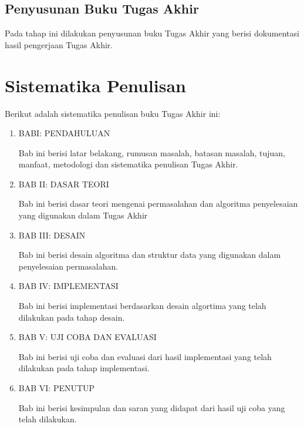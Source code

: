 \subsection{Penyusunan Buku Tugas Akhir} 
Pada tahap ini dilakukan penyusunan buku Tugas Akhir yang berisi dokumentasi hasil pengerjaan Tugas Akhir.


\section{Sistematika Penulisan}
Berikut adalah sistematika penulisan buku Tugas Akhir ini:
\begin{enumerate}
	\item BABI: PENDAHULUAN
	
	Bab ini berisi latar belakang, rumusan masalah, batasan masalah, tujuan, manfaat, metodologi dan sistematika penulisan Tugas Akhir.
	
	\item BAB II: DASAR TEORI
	
	Bab ini berisi dasar teori mengenai permasalahan dan algoritma penyelesaian yang digunakan dalam Tugas Akhir
	
	\item BAB III: DESAIN
	
	Bab ini berisi desain algoritma dan struktur data yang digunakan dalam penyelesaian permasalahan.
	
	\item BAB IV: IMPLEMENTASI
	
	Bab ini berisi implementasi berdasarkan desain algortima yang telah dilakukan pada tahap desain.
	
	\item BAB V: UJI COBA DAN EVALUASI
	
	Bab ini berisi uji coba dan evaluasi dari hasil implementasi yang telah dilakukan pada tahap implementasi.
	
	\item BAB VI: PENUTUP
	
	Bab ini berisi kesimpulan dan saran yang didapat dari hasil uji coba yang telah dilakukan.
\end{enumerate}

\cleardoublepage
